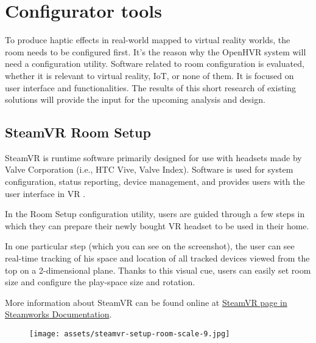 \hypertarget{x-configurator-tools}{\section{Configurator tools}}
To produce haptic effects in real-world mapped to virtual reality worlds,
the room needs to be configured first.
It’s the reason why the OpenHVR system will need a configuration utility.
Software related to room configuration is evaluated, whether it is relevant
to virtual reality, IoT, or none of them. It is focused on user interface and functionalities.
The results of this short research of existing solutions
will provide the input for the upcoming analysis and design.


\hypertarget{x-steamvr-room-setup}{\subsection{SteamVR Room Setup}}
SteamVR is runtime software primarily designed for use with headsets made
by Valve Corporation (i.e., HTC Vive, Valve Index). Software is used for
system configuration, status reporting, device management, and provides users
with the user interface in VR \cite{steamvr}.


In the Room Setup configuration utility, users are guided through a few steps
in which they can prepare their newly bought VR headset to be used in their
home.


In one particular step (which you can see on the screenshot), the user can see
real-time tracking of his space and location of all tracked devices viewed
from the top on a 2-dimensional plane. Thanks to this visual cue, users can
easily set room size and configure the play-space size and rotation.


More information about SteamVR can be found online at
\href{https://partner.steamgames.com/doc/features/steamvr/info}{SteamVR page in Steamworks Documentation}.


\begin{figure}[h]{}
\centering\texttt{[image: assets/steamvr-setup-room-scale-9.jpg]}
\caption{}
\end{figure}

